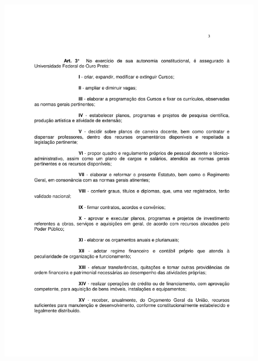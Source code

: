 \begin{figure}[p]
	\centering 
	\includegraphics[scale=0.7]{capitulos/resolucoes/cuni414/cuni414-3.pdf}
\end{figure}

